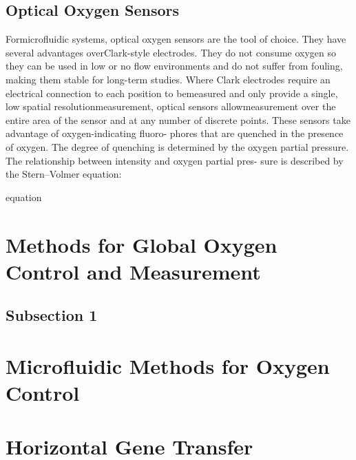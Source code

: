 \subsection{Optical Oxygen Sensors}

Formicrofluidic systems, optical oxygen sensors are the tool of choice. They have several advantages overClark-style electrodes. They do not consume oxygen so they can be used in low or no flow environments and do not suffer from fouling, making them stable for long-term studies. Where Clark electrodes require an electrical connection to each position to bemeasured and only provide a single, low spatial resolutionmeasurement, optical sensors allowmeasurement over the entire area of the sensor and at any number of discrete points. These sensors take advantage of oxygen-indicating fluoro-
phores that are quenched in the presence of oxygen. The degree of quenching is determined by the oxygen partial pressure. The relationship between intensity and oxygen partial pres- sure is described by the Stern–Volmer equation:

equation



\section{Methods for Global Oxygen Control and Measurement}



\subsection{Subsection 1}



\section{Microfluidic Methods for Oxygen Control}




\section{Horizontal Gene Transfer}

